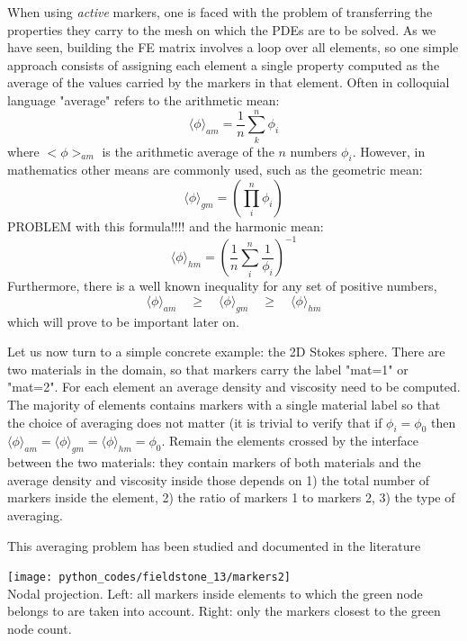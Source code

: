 When using {\it active} markers, one is faced with the problem of transferring the properties they carry to the mesh on which the PDEs are to be solved. 
As we have seen, building the FE matrix involves a loop over all elements, so one simple approach consists of assigning each element a single property
computed as the average of the values carried by the markers in that element. 
Often in colloquial language "average" refers to the arithmetic mean: 
\begin{equation}
\langle \phi \rangle_{am}=\frac{1}{n} \sum_k^n \phi_i 
\end{equation}
where $<\phi>_{am}$ is the arithmetic average of the $n$ numbers $\phi_i$. 
However, in mathematics other means are commonly used, such as the geometric mean: 
\begin{equation}
\langle \phi \rangle_{gm}=\left( \prod_i^n \phi_i \right)
\end{equation}
PROBLEM with this formula!!!!
and the harmonic mean: 
\begin{equation}
\langle \phi \rangle_{hm}=\left( \frac{1}{n}\sum_i^n \frac{1}{\phi_i} \right)^{-1}
\end{equation}
Furthermore, there is a well known inequality for any set of positive numbers,
\begin{equation}
\langle \phi \rangle_{am}\quad  \geq \quad
\langle \phi \rangle_{gm}\quad  \geq \quad
\langle \phi \rangle_{hm} 
\end{equation}
which will prove to be important later on. 

Let us now turn to a simple concrete example: the 2D Stokes sphere. 
There are two materials in the domain, so that markers carry the label "mat=1" or "mat=2".
For each element an average density and viscosity need to be computed. The majority of elements contains markers
with a single material label so that the choice of averaging does not matter (it is trivial to verify that 
if $\phi_i=\phi_0$ then $\langle \phi \rangle_{am}=\langle \phi \rangle_{gm}=\langle \phi \rangle_{hm}=\phi_0$.
Remain the elements crossed by the interface between the two materials: they contain markers of both materials
and the average density and viscosity inside those depends on 1) the total number of markers inside the element, 
2) the ratio of markers 1 to markers 2, 3) the type of averaging. 

This averaging problem has been studied and documented in the literature \cite{scbe08,deka08,thmk14,pukp16}

\begin{center}
\texttt{[image: python\_codes/fieldstone\_13/markers2]}\\
{\small Nodal projection. Left: all markers inside elements to which the green node belongs to are taken into account. Right: only the markers closest to the green node count. }
\end{center}

